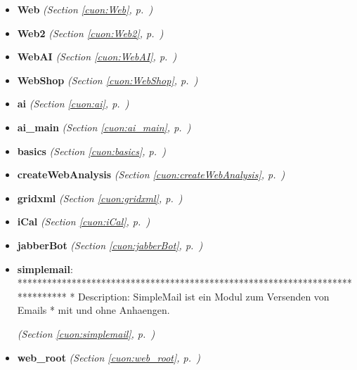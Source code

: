 \begin{itemize}
\item \textbf{Web}
  \textit{(Section \ref{cuon:Web}, p.~\pageref{cuon:Web})}

\item \textbf{Web2}
  \textit{(Section \ref{cuon:Web2}, p.~\pageref{cuon:Web2})}

\item \textbf{WebAI}
  \textit{(Section \ref{cuon:WebAI}, p.~\pageref{cuon:WebAI})}

\item \textbf{WebShop}
  \textit{(Section \ref{cuon:WebShop}, p.~\pageref{cuon:WebShop})}

\item \textbf{ai}
  \textit{(Section \ref{cuon:ai}, p.~\pageref{cuon:ai})}

\item \textbf{ai\_main}
  \textit{(Section \ref{cuon:ai_main}, p.~\pageref{cuon:ai_main})}

\item \textbf{basics}
  \textit{(Section \ref{cuon:basics}, p.~\pageref{cuon:basics})}

\item \textbf{createWebAnalysis}
  \textit{(Section \ref{cuon:createWebAnalysis}, p.~\pageref{cuon:createWebAnalysis})}

\item \textbf{gridxml}
  \textit{(Section \ref{cuon:gridxml}, p.~\pageref{cuon:gridxml})}

\item \textbf{iCal}
  \textit{(Section \ref{cuon:iCal}, p.~\pageref{cuon:iCal})}

\item \textbf{jabberBot}
  \textit{(Section \ref{cuon:jabberBot}, p.~\pageref{cuon:jabberBot})}

\item \textbf{simplemail}: ******************************************************************************
* Description:  SimpleMail ist ein Modul zum Versenden von Emails *
mit und ohne Anhaengen.



  \textit{(Section \ref{cuon:simplemail}, p.~\pageref{cuon:simplemail})}

\item \textbf{web\_root}
  \textit{(Section \ref{cuon:web_root}, p.~\pageref{cuon:web_root})}

\end{itemize}




